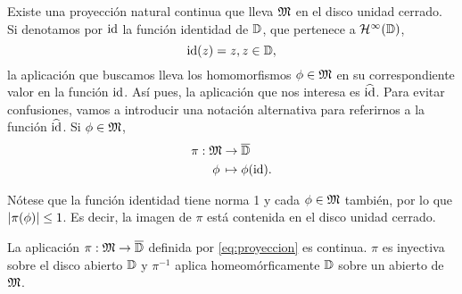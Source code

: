 Existe una proyección natural continua que lleva $\mathfrak{M}$ en el disco unidad cerrado. Si denotamos por $\operatorname{id}$ la función identidad de $\mathbb{D}$, que pertenece a $\mathcal{H}^{\infty}(\mathbb{D})$,
\begin{equation*}
    \operatorname{id}(z) = z, z \in \mathbb{D},
\end{equation*}
la aplicación que buscamos lleva los homomorfismos $\phi \in \mathfrak{M}$ en su correspondiente valor en la función $\operatorname{id}$. Así pues, la aplicación que nos interesa es $\widehat {\operatorname{id}}$. Para evitar confusiones, vamos a introducir una notación alternativa para referirnos a la función $\widehat {\operatorname{id}}$. Si $\phi \in \mathfrak{M}$,
\begin{equation}
    \label{eq:proyeccion}
    \begin{split}
        \pi: \mathfrak{M} & \to \overline{\mathbb{D}} \\
            \phi \, & \mapsto  \phi (\operatorname{id}).
    \end{split}
\end{equation}

Nótese que la función identidad tiene norma 1 y cada $\phi \in \mathfrak{M}$ también, por lo que $\left\lvert\pi(\phi)\right\rvert \leq 1$. Es decir, la imagen de $\pi$ está contenida en el disco unidad cerrado. \\

\begin{theorem}
    La aplicación $\pi: \mathfrak{M} \to \overline{\mathbb{D}}$ definida por \eqref{eq:proyeccion} es continua. $\pi$ es inyectiva sobre el disco abierto $\mathbb{D}$ y $\pi^{-1}$ aplica homeomórficamente $\mathbb{D}$ sobre un abierto de $\mathfrak{M}$.
\end{theorem}

